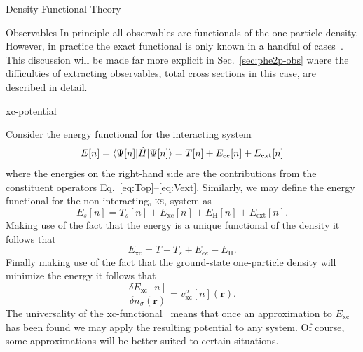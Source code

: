 \documentclass[letterpaper, 11 pt]{report}
\begin{document}
\begin{chapter}{Density Functional Theory \label{chap:dft}}
\begin{section}{Observables \label{sec:obs}}
      In principle all observables are functionals of the one-particle density. However, in practice the
      exact functional is only known in a handful of cases~\cite[p.~211-213]{obs_exac}. This discussion
      will be made far more explicit in Sec.~\ref{sec:phe2p-obs} where the difficulties of extracting
      observables, total cross sections in this case, are described in detail.

   \end{section}

   \begin{section}{xc-potential \label{sec:xcpot}}

      Consider the energy functional for the interacting system
      \begin{equation} \label{eq:efunc}
         E[n] = \braket{\Psi[n] | \hat{H} | \Psi[n] }= T[n] + E_{ee}[n] + E_\mathrm{ext}[n]
      \end{equation}
      where the energies on the right-hand side are the contributions from the constituent operators
      Eq.~\eqref{eq:Top}--\eqref{eq:Vext}. Similarly, we may define the energy functional for the
      non-interacting, \textsc{ks}, system as
      \begin{equation} \label{eq:esfunc}
         E_s[n] =  T_s[n] + E_\mathrm{xc}[n] + E_\mathrm{H}[n] + E_\mathrm{ext}[n].
      \end{equation}
      Making use of the fact that the energy is a unique functional of the density it follows that
      \begin{equation} \label{eq:exc}
         E_\mathrm{xc} = T - T_s + E_{ee} - E_\mathrm{H}.
      \end{equation}
      Finally making use of the fact that the ground-state one-particle density will minimize the energy
      it follows that
      \begin{equation} \label{eq:vxc-der}
         \frac{\delta E_\mathrm{xc}[n]}{\delta n_\sigma(\mathbf{r})}
            = v^\sigma_\mathrm{xc}[n](\mathbf{r}).
      \end{equation}
      The universality of the xc-functional~\cite{dft-engel} means that once an approximation to
      $E_\mathrm{xc}$ has been found we may apply the resulting potential to any system. Of course,
      some approximations will be better suited to certain situations.


\end{section}
\end{chapter}
\end{document}
